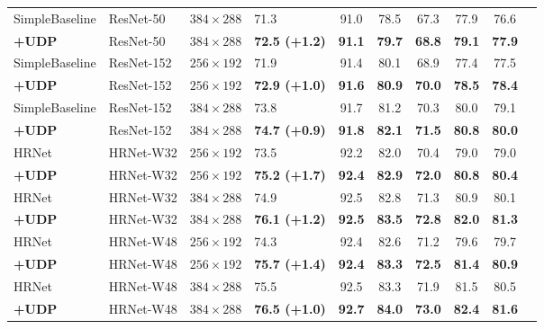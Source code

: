 \documentclass[10pt,journal,compsoc]{IEEEtran}
\begin{document}
\begin{table*}
\begin{center}
\begin{tabular}{l|l|c|lcccccc}
SimpleBaseline\cite{CPN}           & ResNet-50     &$384\times288$       &71.3      & 91.0             & 78.5             & 67.3            &77.9            &76.6\\
\textbf{+UDP}                                         & ResNet-50     &$384\times288$       &\textbf{72.5 (+1.2)}    &\textbf{91.1}           &\textbf{79.7}           &\textbf{68.8}         &\textbf{79.1}          &\textbf{77.9}\\
SimpleBaseline\cite{CPN}           & ResNet-152   &$256\times192$       &71.9       & 91.4            & 80.1             & 68.9            &77.4            &77.5\\
\textbf{+UDP}                                         & ResNet-152  &$256\times192$       &\textbf{72.9 (+1.0)}    &\textbf{91.6}           &\textbf{80.9}           &\textbf{70.0}         &\textbf{78.5}          &\textbf{78.4}\\
SimpleBaseline\cite{CPN}           & ResNet-152   &$384\times288$       &73.8       & 91.7            & 81.2             & 70.3            &80.0            &79.1\\
\textbf{+UDP}                                         & ResNet-152   &$384\times288$       &\textbf{74.7 (+0.9)}    &\textbf{91.8}           &\textbf{82.1}           &\textbf{71.5}         &\textbf{80.8}          &\textbf{80.0}\\
\hline
HRNet\cite{HRNet}                  & HRNet-W32        &$256\times192$       &73.5     & 92.2          & 82.0       & 70.4        &79.0         &79.0\\
\textbf{+UDP}                                     & HRNet-W32        &$256\times192$       &\textbf{75.2 (+1.7)}   & \textbf{92.4}        &\textbf{82.9}     & \textbf{72.0}      &\textbf{80.8}      &\textbf{80.4}\\
HRNet\cite{HRNet}                  & HRNet-W32        &$384\times288$     &74.9     & 92.5          & 82.8       & 71.3        &80.9         &80.1\\
\textbf{+UDP}                                     & HRNet-W32        &$384\times288$       &\textbf{76.1 (+1.2)}   &\textbf{92.5}        & \textbf{83.5}    & \textbf{72.8}      &\textbf{82.0}      &\textbf{81.3}\\
HRNet\cite{HRNet}                 & HRNet-W48        &$256\times192$       &74.3     & 92.4          & 82.6       & 71.2        &79.6         &79.7\\
\textbf{+UDP}                                     & HRNet-W48        &$256\times192$       &\textbf{75.7 (+1.4)}   & \textbf{92.4}        & \textbf{83.3}    &\textbf{ 72.5}      &\textbf{81.4}      &\textbf{80.9}\\
HRNet\cite{HRNet}                  & HRNet-W48        &$384\times288$       &75.5      & 92.5          & 83.3      & 71.9        &81.5         &80.5\\
\textbf{+UDP}                                     & HRNet-W48        &$384\times288$      &\textbf{76.5 (+1.0)}   & \textbf{92.7}        & \textbf{84.0}    & \textbf{73.0}     &\textbf{82.4}      &\textbf{81.6}\\



\end{tabular}
\end{center}
\end{table*}
\end{document}
